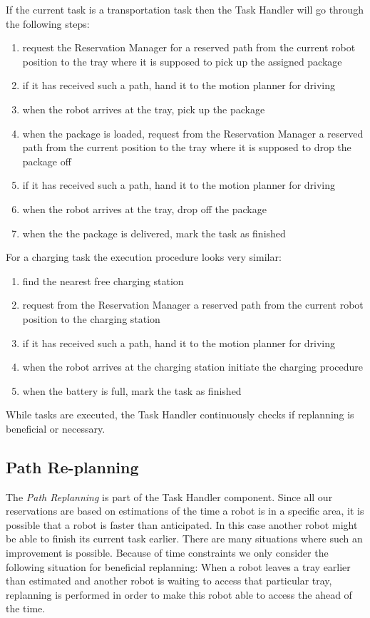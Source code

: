 \documentclass[journal]{IEEEtran}
\begin{document}
If the current task is a transportation task then the Task Handler will go through the following steps:
\begin{enumerate}
	\item request the Reservation Manager for a reserved path from the current robot position to the tray where it is supposed to pick up the assigned package
	\item if it has received such a path, hand it to the motion planner for driving
	\item when the robot arrives at the tray, pick up the package
	\item when the package is loaded, request from the Reservation Manager a reserved path from the current position to the tray where it is supposed to drop the package off
	\item if it has received such a path, hand it to the motion planner for driving
	\item when the robot arrives at the tray, drop off the package
	\item when the the package is delivered, mark the task as finished
\end{enumerate}
For a charging task the execution procedure looks very similar:
\begin{enumerate}
	\item find the nearest free charging station
	\item request from the Reservation Manager a reserved path from the current robot position to the charging station
	\item if it has received such a path, hand it to the motion planner for driving
	\item when the robot arrives at the charging station initiate the charging procedure
	\item when the battery is full, mark the task as finished
\end{enumerate}
While tasks are executed, the Task Handler continuously checks if replanning is beneficial or necessary.

\subsection{Path Re-planning}
\label{subsec:path_replanning}
The \textit{Path Replanning} is part of the Task Handler component.
Since all our reservations are based on estimations of the time a robot is in a specific area, it is possible that a robot is faster than anticipated. In this case another robot might be able to finish its current task earlier.
There are many situations where such an improvement is possible. Because of time constraints we only consider the following situation for beneficial replanning:
When a robot leaves a tray earlier than estimated and another robot is waiting to access that particular tray, replanning is performed in order to make this robot able to access the ahead of the time.
\end{document}
